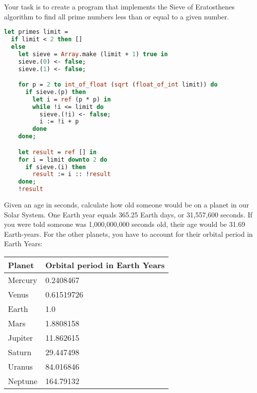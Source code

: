 \problem[Sieve]
Your task is to create a program that implements the Sieve of Eratosthenes algorithm to find all prime numbers less than or equal to a given number.

\begin{lstlisting}[language=OCaml]
let primes limit =
  if limit < 2 then []
  else
    let sieve = Array.make (limit + 1) true in
    sieve.(0) <- false;
    sieve.(1) <- false;

    for p = 2 to int_of_float (sqrt (float_of_int limit)) do
      if sieve.(p) then
        let i = ref (p * p) in
        while !i <= limit do
          sieve.(!i) <- false;
          i := !i + p
        done
    done;

    let result = ref [] in
    for i = limit downto 2 do
      if sieve.(i) then
        result := i :: !result
    done;
    !result
\end{lstlisting}

Given an age in seconds, calculate how old someone would be on a planet in our Solar System.
One Earth year equals 365.25 Earth days, or 31,557,600 seconds.
If you were told someone was 1,000,000,000 seconds old, their age would be 31.69 Earth-years.
For the other planets, you have to account for their orbital period in Earth Years:

\begin{center}
  \begin{tabular}{l|l}
    Planet  & Orbital period in Earth Years \\
    \hline
    Mercury & 0.2408467                     \\
    Venus   & 0.61519726                    \\
    Earth   & 1.0                           \\
    Mars    & 1.8808158                     \\
    Jupiter & 11.862615                     \\
    Saturn  & 29.447498                     \\
    Uranus  & 84.016846                     \\
    Neptune & 164.79132                     \\
  \end{tabular}
\end{center}

